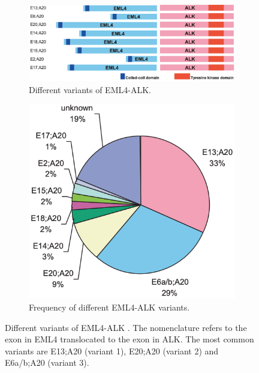 \begin{figure}[t]
    \centering
    \begin{subfigure}{0.64\textwidth}
        \centering
        \includegraphics[width=\textwidth]{Images/chapter_1/variants_EML4-ALK.png}
        \caption{Different variants of EML4-ALK.}
        \label{fig:EML4-ALK_variants}
    \end{subfigure}
    \hfill
    \begin{subfigure}{0.34\textwidth}
        \centering
        \includegraphics[width=\textwidth]{Images/chapter_1/frequency_variants_EML4-ALK.png}
        \caption{Frequency of different EML4-ALK variants.}
        \label{fig:EML4-ALK_frequency}
    \end{subfigure}
    \caption{Different variants of EML4-ALK \cite{EML4_ALK_biology}. The nomenclature refers to the exon in EML4 translocated to the exon in ALK. The most common variants are E13;A20 (variant 1), E20;A20 (variant 2) and E6a\slash b;A20 (variant 3).}
    \label{fig:EML4-ALK}
\end{figure}


